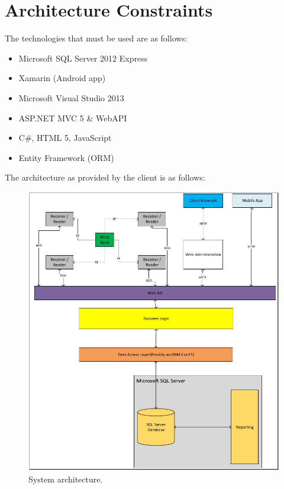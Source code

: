 \documentclass[11pt,titlepage]{article}
\begin{document}
\section{Architecture Constraints}
The technologies that must be used are as follows:
\begin{itemize}
\item Microsoft SQL Server 2012 Express
\item Xamarin (Android app)
\item Microsoft Visual Studio 2013
\item ASP.NET MVC 5 \& WebAPI
\item C\#, HTML 5, JavaScript
\item Entity Framework (ORM)
\end{itemize}
The architecture as provided by the client is as follows:
\begin{figure}[H]
\begin{center}
\includegraphics[scale=0.8]{SystemArchitecture.jpg}
\caption{System architecture.}
\end{center}
\end{figure}
\end{document}

